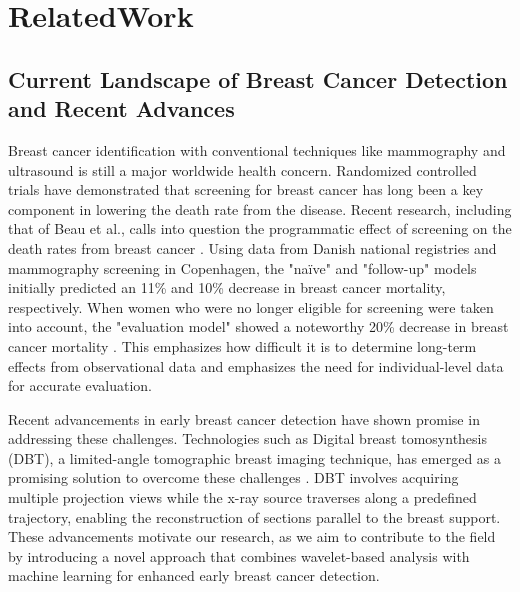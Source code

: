 \chapter{RelatedWork}
\label{chap2}
\section{Current Landscape of Breast Cancer Detection and Recent Advances}
Breast cancer identification with conventional techniques like mammography and ultrasound is still a major worldwide health concern. Randomized controlled trials have demonstrated that screening for breast cancer has long been a key component in lowering the death rate from the disease. Recent research, including that of Beau et al., calls into question the programmatic effect of screening on the death rates from breast cancer \cite{Mortality}. Using data from Danish national registries and mammography screening in Copenhagen, the "naïve" and "follow-up" models initially predicted an 11\% and 10\% decrease in breast cancer mortality, respectively. When women who were no longer eligible for screening were taken into account, the "evaluation model" showed a noteworthy 20\% decrease in breast cancer mortality \cite{Mortality}. This emphasizes how difficult it is to determine long-term effects from observational data and emphasizes the need for individual-level data for accurate evaluation. 

Recent advancements in early breast cancer detection have shown promise in addressing these challenges. Technologies such as Digital breast tomosynthesis (DBT), a limited-angle tomographic breast imaging technique, has emerged as a promising solution to overcome these challenges \cite{Tomosynthesis}. DBT involves acquiring multiple projection views while the x-ray source traverses along a predefined trajectory, enabling the reconstruction of sections parallel to the breast support. These advancements motivate our research, as we aim to contribute to the field by introducing a novel approach that combines wavelet-based analysis with machine learning for enhanced early breast cancer detection.
